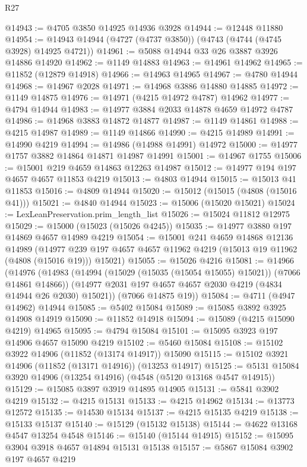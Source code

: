 \begin{lexlean}{R27}
\begin{coremodule}
@14943 := @4705 @3850 @14925 @14936 @3928
@14944 := @12448 @11880
@14954 := @14943 @14944 (@4727 (@4737 @3850)) (@4743 (@4744 (@4745 @3928) @14925 @4721))
@14961 := @5088 @14944 @33 @26 @3887 @3926 @14886 @14920
@14962 := @1149 @14883
@14963 := @14961 @14962
@14965 := @11852 (@12879 @14918)
@14966 := @14963 @14965
@14967 := @4780 @14944
@14968 := @14967 @2028
@14971 := @14968 @3886 @14880 @14885
@14972 := @1149 @14875
@14976 := @14971 (@4215 @14972 @4787) @14962
@14977 := @4794 @14944
@14983 := @14977 @3884 @2033 @14878 @4659 @14972 @4787
@14986 := @14968 @3883 @14872 @14877
@14987 := @1149 @14861
@14988 := @4215 @14987
@14989 := @1149 @14866
@14990 := @4215 @14989
@14991 := @14990 @4219
@14994 := @14986 (@14988 @14991) @14972
@15000 := @14977 @1757 @3882 @14864 @14871 @14987 @14991
@15001 := @14967 @1755
@15006 := @15001 @219 @4659 @14863 @12263 @14987
@15012 := @14977 @194 @197 @4657 @4657 @11853 @4219
@15013 := @4803 @14944
@15015 := @15013 @41 @11853
@15016 := @4809 @14944
@15020 := @15012 (@15015 (@4808 (@15016 @41)))
@15021 := @4840 @14944
@15023 := @15006 (@15020 @15021)
@15024 := LexLeanPreservation.prim_length_list
@15026 := @15024 @11812 @12975
@15029 := @15000 (@15023 (@15026 @4245))
@15035 := @14977 @3880 @197 @14869 @4657 @14989 @4219
@15054 := @15001
    @241
    @4659
    @14868
    @12136
    @14989
    (@14977 @239 @197 @4657 @4657 @11962 @4219 (@15013 @19 @11962 (@4808 (@15016 @19))) @15021)
@15055 := @15026 @4216
@15081 := @14966
    (@14976
      (@14983
        (@14994 (@15029 (@15035 (@15054 @15055) @15021)) (@7066 @14861 @14866))
        (@14977 @2031 @197 @4657 @4657 @2030 @4219 (@4834 @14944 @26 @2030) @15021))
      (@7066 @14875 @19))
@15084 := @4711 (@4947 @14962) @14944
@15085 := @5402 @15084
@15089 := @15085 @3892 @3925 @14908 @14919
@15090 := @11852 @14918
@15094 := @15089 (@4215 @15090 @4219) @14965
@15095 := @4794 @15084
@15101 := @15095 @3923 @197 @14906 @4657 @15090 @4219
@15102 := @5460 @15084
@15108 := @15102 @3922 @14906 (@11852 (@13174 @14917)) @15090
@15115 := @15102 @3921 @14906 (@11852 (@13171 @14916)) (@13253 @14917)
@15125 := @5131 @15084 @3920 @14906 (@13254 @14916) (@4548 (@5120 @13168 @4547 @14915))
@15129 := @15085 @3897 @3919 @14895 @14905
@15131 := @5841 @3902 @4219
@15132 := @4215 @15131
@15133 := @4215 @14962
@15134 := @13773 @12572
@15135 := @14530 @15134
@15137 := @4215 @15135 @4219
@15138 := @15133 @15137
@15140 := @15129 (@15132 @15138)
@15144 := @4622 @13168 @4547 @13254 @4548
@15146 := @15140 (@15144 @14915)
@15152 := @15095 @3904 @3918 @4657 @14894 @15131 @15138
@15157 := @5867 @15084 @3902 @197 @4657 @4219

\end{coremodule}
\end{lexlean}
